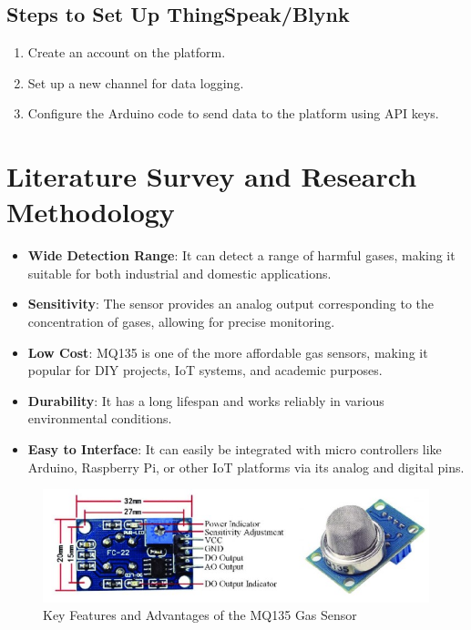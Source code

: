 \documentclass[12pt]{report}
\begin{document}
	\subsection*{Steps to Set Up ThingSpeak/Blynk}
	\begin{enumerate}
		\item Create an account on the platform.
		\item Set up a new channel for data logging.
		\item Configure the Arduino code to send data to the platform using API keys.
	\end{enumerate}
	
	
	\section{Literature Survey and Research Methodology}
	
	\begin{itemize}
		\item \textbf{Wide Detection Range}: It can detect a range of harmful gases, making it suitable for both industrial and domestic applications.
		\item \textbf{Sensitivity}: The sensor provides an analog output corresponding to the concentration of gases, allowing for precise monitoring.
		\item \textbf{Low Cost}: MQ135 is one of the more affordable gas sensors, making it popular for DIY projects, IoT systems, and academic purposes.
		\item \textbf{Durability}: It has a long lifespan and works reliably in various environmental conditions.
		\item \textbf{Easy to Interface}: It can easily be integrated with micro controllers like Arduino, Raspberry Pi, or other IoT platforms via its analog and digital pins.
	\end{itemize}
	
	
	\begin{figure}[ht]
		\centering
		\includegraphics[scale=1.2]{widedetection.jpg}
		\caption[wide_detection]{Key Features and Advantages of the MQ135 Gas Sensor}
		\label{wide_detection}
	\end{figure}
	
\end{document}
